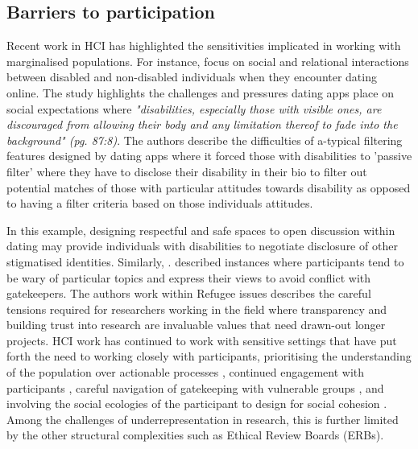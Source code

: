 \subsection{Barriers to participation}
\label{MP:barriers}
Recent work in HCI has highlighted the sensitivities implicated in working with marginalised populations. For instance, \cite{porter_filtered_2017} focus on social and relational interactions between disabled and non-disabled individuals when they encounter dating online. The study highlights the challenges and pressures dating apps place on social expectations where \textit{"disabilities, especially those with visible ones, are discouraged from allowing their body and any limitation thereof to fade into the background" (pg. 87:8)}. The authors describe the difficulties of a-typical filtering features designed by dating apps where it forced those with disabilities to 'passive filter' where they have to disclose their disability in their bio to filter out potential matches of those with particular attitudes towards disability as opposed to having a filter criteria based on those individuals attitudes. 

In this example, designing respectful and safe spaces to open discussion within dating may provide individuals with disabilities to negotiate disclosure of other stigmatised identities. Similarly, \cite{talhouk_syrian_2016}. described instances where participants tend to be wary of particular topics and express their views to avoid conflict with gatekeepers. The authors work within Refugee issues describes the careful tensions required for researchers working in the field where transparency and building trust into research are invaluable values that need drawn-out longer projects. HCI work has continued to work with sensitive settings that have put forth the need to working closely with participants, prioritising the understanding of the population over actionable processes \citep{group_patron_2019}, continued engagement with participants \citep{waycott_ethical_2015}, careful navigation of gatekeeping with vulnerable groups  \citep{sanghera_methodological_2008}, and involving the social ecologies of the participant to design for social cohesion \citep{talja2005isms}. Among the challenges of underrepresentation in research, this is further limited by the other structural complexities such as Ethical Review Boards (ERBs). 

